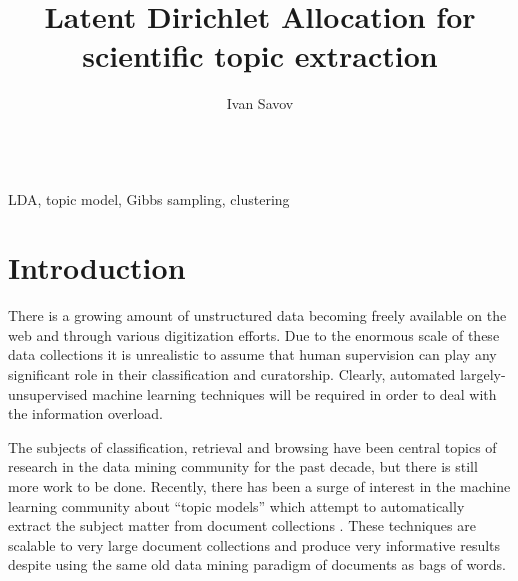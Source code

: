 \documentclass[11pt]{article}
\author{Ivan Savov}
\title{ {\LARGE Latent Dirichlet Allocation for \\ scientific topic extraction } }
\begin{document}
\maketitle


\ \\
 LDA, topic model, Gibbs sampling, clustering 


\section{Introduction}

    There is a growing amount of unstructured data becoming freely available on the web and
    through various digitization efforts.
    Due to the enormous scale of these data collections it is unrealistic to assume that human
    supervision can play any significant role in their classification and curatorship.
    Clearly, automated largely-unsupervised machine learning techniques will be required
    in order to deal with the information overload.

    The subjects of classification, retrieval and browsing have been central topics of research
    in the data mining community for the past decade, but there is still more work to be done.
    Recently, there has been a surge of interest in the machine learning community about
    ``topic models'' which attempt to automatically extract the subject matter from
    document collections \cite{Blei2003,Blei2009}.
    These techniques are scalable to very large document collections and produce very informative
    results despite using the same old data mining paradigm of documents as bags of words.
\end{document}
